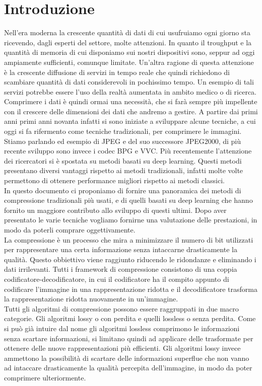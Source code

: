 \chapter*{Introduzione}
Nell’era moderna la crescente quantità di dati di cui usufruiamo ogni giorno sta ricevendo, dagli esperti del settore, molte attenzioni. In quanto il troughput e la quantità di memoria di cui disponiamo sui nostri dispositivi sono, seppur ad oggi ampiamente sufficienti, comunque limitate. Un’altra ragione di questa attenzione è la crescente diffusione di servizi in tempo reale che quindi richiedono di scambiare quantità di dati considerevoli in pochissimo tempo. Un esempio di tali servizi potrebbe essere l’uso della realtà aumentata in ambito medico o di ricerca. Comprimere i dati è quindi ormai una necessità, che si farà sempre più impellente con il crescere delle dimensioni dei dati che andremo a gestire.
A partire dai primi anni primi anni novanta infatti si sono iniziate a sviluppare alcune tecniche, a cui oggi si fa rifermento come tecniche tradizionali, per comprimere le immagini. Stiamo parlando ed esempio di JPEG e del suo successore JPEG2000, di più recente sviluppo sono invece i codec BPG e VVC.
Più recentemente l’attenzione dei ricercatori si è spostata su metodi basati su deep learning. Questi metodi presentano diversi vantaggi rispetto ai metodi tradizionali, infatti molte volte permettono di ottenere performance migliori rispetto ai metodi classici.\\
In questo documento ci proponiamo di fornire una panoramica dei metodi di compressione tradizionali più usati, e di quelli basati su deep learning che hanno fornito un maggiore contributo allo sviluppo di questi ultimi. Dopo aver presentato le varie tecniche vogliamo fornirne una valutazione delle prestazioni, in modo da poterli comprare oggettivamente.\\
La compressione è un processo che mira a minimizzare il numero di bit utilizzati per rappresentare una certa informazione senza intaccarne drasticamente la qualità. Questo obbiettivo viene raggiunto riducendo le ridondanze e eliminando i dati irrilevanti.
Tutti i framework di compressione consistono di una coppia codificatore-decodificatore, in cui il codificatore ha il compito appunto di codificare l’immagine in una rappresentazione ridotta e il decodificatore trasforma la rappresentazione ridotta nuovamente in un’immagine.\\
Tutti gli algoritmi di compressione possono essere raggruppati in due macro categorie. Gli algoritmi lossy o con perdita e quelli lossless o senza perdita. Come si può già intuire dal nome gli algoritmi lossless comprimono le informazioni senza scartare informazioni, si limitano quindi ad applicare delle trasformate per ottenere delle nuove rappresentazioni più efficienti. Gli algoritmi lossy invece ammettono la possibilità di scartare delle informazioni superflue che non vanno ad intaccare drasticamente la qualità percepita dell’immagine, in modo da poter comprimere ulteriormente.
